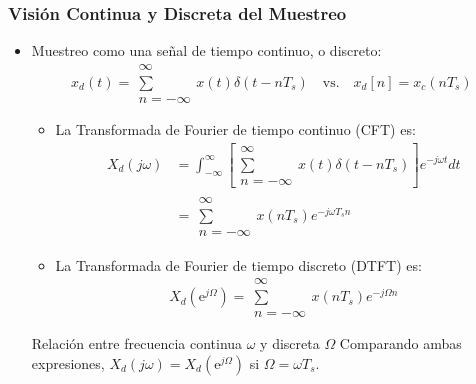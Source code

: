 \documentclass[handout]{beamer}
\numberwithin{section}{part}
\begin{document}
  \begin{frame}
  \frametitle{Visión Continua y Discreta del Muestreo}
    \begin{itemize}
      \item Muestreo como una señal de tiempo continuo, o discreto:\\ 
      \[
        x_d(t) = \substack{\infty \\ \sum \\n=-\infty} x(t)\delta(t-nT_s)
        \quad\text{vs.}\quad
        x_d[n] = x_c(nT_s)
      \]
      
      \begin{itemize}
          \footnotesize
          \item La Transformada de Fourier de tiempo continuo (CFT) es: \\
          \[
          \begin{aligned}
          X_d(j\omega)&=\int_{-\infty}^{\infty}\left[\substack{\infty \\ \sum \\n=-\infty} x(t)\delta(t - nT_s)\right]e^{-j\omega t}dt\\
                      &=\substack{\infty \\ \sum \\n=-\infty} x(nT_s)e^{-j\omega T_s n}
          \end{aligned}
          \]
          \item La Transformada de Fourier de tiempo discreto (DTFT) es: \\
          \[
          X_d(\mathrm{e}^{j\Omega})=\substack{\infty \\ \sum \\n=-\infty} x(nT_s)e^{-j\Omega n}
          \]

        \end{itemize}
        \begin{alertblock}{Relación entre frecuencia continua $\omega$ y discreta $\Omega$}
            Comparando ambas expresiones, $X_d(j\omega)=X_d(\mathrm{e}^{j\Omega})$ si $\Omega=\omega T_s$.
        \end{alertblock}
    \end{itemize}    
  \end{frame}
\end{document}
